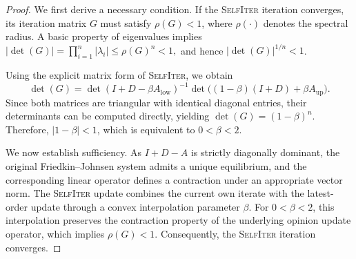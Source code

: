 \documentclass[sigconf,review, nonacm]{acmart}
\renewcommand\AA{\boldsymbol{\mathit{A}}}
\newcommand\DD{\boldsymbol{\mathit{D}}}
\newcommand\II{\boldsymbol{\mathit{I}}}
\newcommand\GG{\boldsymbol{\mathit{G}}}
\begin{document}
\begin{proof}
	We first derive a necessary condition.
	If the \textsc{SelfIter} iteration converges, its iteration matrix
	$\GG$ must satisfy $\rho(\GG)<1$,
	where $\rho(\cdot)$ denotes the spectral radius.
	A basic property of eigenvalues implies
$	|\det(\GG)|
	= \prod_{i=1}^n |\lambda_i|
	\le \rho(\GG)^n < 1 ,$
	and hence $|\det(\GG)|^{1/n}<1$.
	
	Using the explicit matrix form of \textsc{SelfIter}, we obtain
	\[
	\det(\GG)
	=
	\det(\II+\DD-\beta \AA_{\mathrm{low}})^{-1}
	\det\bigl((1-\beta)(\II+\DD)+\beta \AA_{\mathrm{up}}\bigr).
	\]
	Since both matrices are triangular with identical diagonal entries,
	their determinants can be computed directly, yielding
	$	\det(\GG) = (1-\beta)^n .$
	Therefore, $|1-\beta|<1$, which is equivalent to $0<\beta<2$.
	
	We now establish sufficiency.
	As $\II+\DD-\AA$ is strictly diagonally dominant, the original Friedkin--Johnsen system admits a unique equilibrium,
	and the corresponding linear operator defines a contraction under an appropriate vector norm.
	The \textsc{SelfIter} update combines the current own iterate with the latest-order update
	through a convex interpolation parameter $\beta$.
	For $0<\beta<2$, this interpolation preserves the contraction property of the underlying
	opinion update operator, which implies $\rho(\GG)<1$.
	Consequently, the \textsc{SelfIter} iteration converges.
	
	
\end{proof}

%
%
\end{document}

